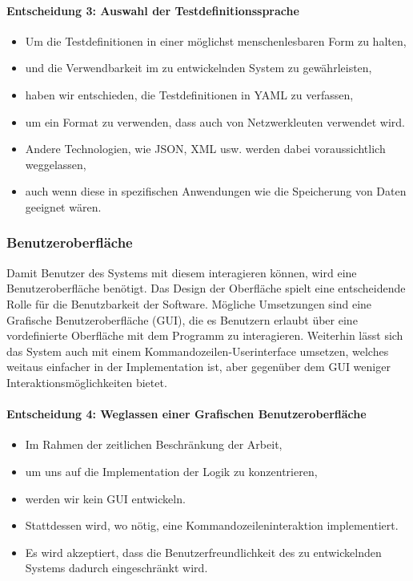 \documentclass[
	ngerman,
	toc=listof, %
	toc=bibliography, %
	footnotes=multiple, %
	parskip=half, %
	numbers=noendperiod %
]{scrartcl}
\begin{document}
		\paragraph{Entscheidung 3: Auswahl der Testdefinitionssprache}
		\begin{itemize}
			\item Um die Testdefinitionen in einer möglichst menschenlesbaren Form zu halten,
			\item und die Verwendbarkeit im zu entwickelnden System zu gewährleisten,
			\item haben wir entschieden, die Testdefinitionen in YAML zu verfassen,
			\item um ein Format zu verwenden, dass auch von Netzwerkleuten verwendet wird.
			\item Andere Technologien, wie JSON, XML usw. werden dabei voraussichtlich weggelassen,
			\item auch wenn diese in spezifischen Anwendungen wie die Speicherung von Daten geeignet wären.
		\end{itemize}
		\newpage

		\subsubsection{Benutzeroberfläche}
		Damit Benutzer des Systems mit diesem interagieren können, wird eine Benutzeroberfläche benötigt.
		Das Design der Oberfläche spielt eine entscheidende Rolle für die Benutzbarkeit der Software. 
		Mögliche Umsetzungen sind eine Grafische Benutzeroberfläche (GUI), die es Benutzern erlaubt über eine vordefinierte Oberfläche mit dem Programm zu interagieren.
		Weiterhin lässt sich das System auch mit einem Kommandozeilen-Userinterface umsetzen, welches weitaus einfacher in der Implementation ist, aber gegenüber dem GUI weniger Interaktionsmöglichkeiten bietet.

		\paragraph{Entscheidung 4: Weglassen einer Grafischen Benutzeroberfläche}
		\begin{itemize}
			\item Im Rahmen der zeitlichen Beschränkung der Arbeit,
			\item um uns auf die Implementation der Logik zu konzentrieren,
			\item werden wir kein GUI entwickeln.
			\item Stattdessen wird, wo nötig, eine Kommandozeileninteraktion implementiert.
			\item Es wird akzeptiert, dass die Benutzerfreundlichkeit des zu entwickelnden Systems dadurch eingeschränkt wird.
		\end{itemize}
\end{document}
